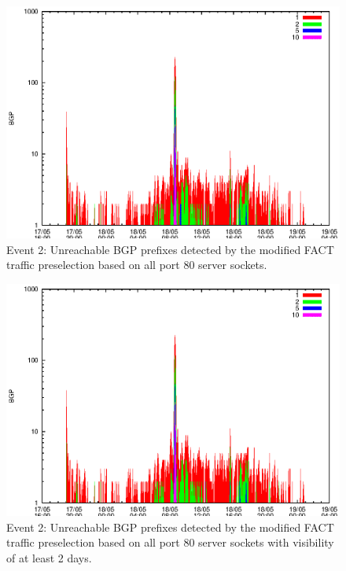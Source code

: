 \begin{figure}
	[p] \centering 
	\includegraphics[width=0.75\linewidth]{images/events/2010_05_18/bgp_log_allPort80SES.eps}
	\caption{Event 2: Unreachable BGP prefixes detected by the modified FACT traffic preselection based on all port 80 server sockets.} 
	\label{fig:TIER1_FACT_allSES80} 
\end{figure}


\begin{figure}
	[p] \centering 
	\includegraphics[width=0.75\linewidth]{images/events/2010_05_18/bgp_log_port80_Set_stab_0_vts_2.eps}
	\caption{Event 2: Unreachable BGP prefixes detected by the modified FACT traffic preselection based on all port 80 server sockets with visibility of at least 2 days.} 
	\label{fig:TIER1_FACT_allSES80VTS2} 
\end{figure}

